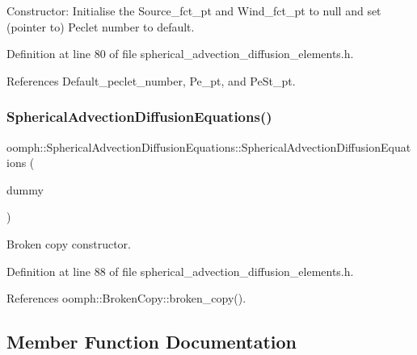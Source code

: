 Constructor\+: Initialise the Source\+\_\+fct\+\_\+pt and Wind\+\_\+fct\+\_\+pt to null and set (pointer to) Peclet number to default. 



Definition at line 80 of file spherical\+\_\+advection\+\_\+diffusion\+\_\+elements.\+h.



References Default\+\_\+peclet\+\_\+number, Pe\+\_\+pt, and Pe\+St\+\_\+pt.

\mbox{\label{classoomph_1_1SphericalAdvectionDiffusionEquations_a3ef8f55c02bf521af9da3cae9eb2a689}} 
\subsubsection{\texorpdfstring{Spherical\+Advection\+Diffusion\+Equations()}{SphericalAdvectionDiffusionEquations()}\hspace{0.1cm}{\footnotesize\ttfamily [2/2]}}
{\footnotesize\ttfamily oomph\+::\+Spherical\+Advection\+Diffusion\+Equations\+::\+Spherical\+Advection\+Diffusion\+Equations (\begin{DoxyParamCaption}\item[{const \hyperlink{classoomph_1_1SphericalAdvectionDiffusionEquations}{Spherical\+Advection\+Diffusion\+Equations} \&}]{dummy }\end{DoxyParamCaption})\hspace{0.3cm}{\ttfamily [inline]}}



Broken copy constructor. 



Definition at line 88 of file spherical\+\_\+advection\+\_\+diffusion\+\_\+elements.\+h.



References oomph\+::\+Broken\+Copy\+::broken\+\_\+copy().



\subsection{Member Function Documentation}
\mbox{\label{classoomph_1_1SphericalAdvectionDiffusionEquations_a92998bc7fd574a8e0bb6afe3694fb62b}} 
